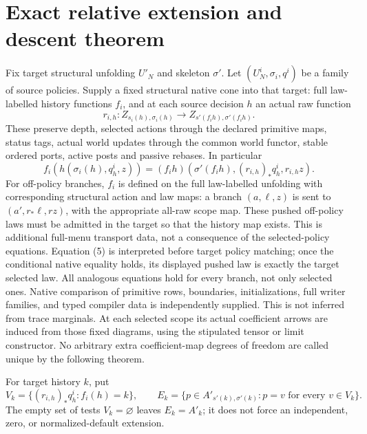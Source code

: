 \documentclass[11pt]{article}
\begin{document}
\section{Exact relative extension and descent theorem}
Fix target structural unfolding $U'_N$ and skeleton $\sigma'$. Let $(U_N^i,\sigma_i,q^i)$ be a family of source policies. Supply a fixed structural native cone into that target: full law-labelled history functions $f_i$, and at each source decision $h$ an actual raw function
\[
 r_{i,h}:Z_{s_i(h),\sigma_i(h)}\longrightarrow
          Z_{s'(f_i h),\sigma'(f_i h)}.                 \tag{4}
\]
These preserve depth, selected actions through the declared primitive maps, status tags, actual world updates through the common world functor, stable ordered ports, active posts and passive rebases. In particular
\[
 f_i(h(\sigma_i(h),q^i_h,z))=(f_i h)(\sigma'(f_i h),(r_{i,h})_*q^i_h,r_{i,h}z). \tag{5}
\]
For off-policy branches, $f_i$ is defined on the full law-labelled unfolding with corresponding structural action and law maps: a branch $(a,\ell,z)$ is sent to $(a',r_*\ell,rz)$, with the appropriate all-raw scope map. These pushed off-policy laws must be admitted in the target so that the history map exists. This is additional full-menu transport data, not a consequence of the selected-policy equations. Equation (5) is interpreted before target policy matching; once the conditional native equality holds, its displayed pushed law is exactly the target selected law. All analogous equations hold for every branch, not only selected ones. Native comparison of primitive rows, boundaries, initializations, full writer families, and typed compiler data is independently supplied. This is not inferred from trace marginals. At each selected scope its actual coefficient arrows are induced from those fixed diagrams, using the stipulated tensor or limit constructor. No arbitrary extra coefficient-map degrees of freedom are called unique by the following theorem.

For target history $k$, put
\[
 V_k=\{(r_{i,h})_*q^i_h:f_i(h)=k\},\qquad
 E_k=\{p\in A'_{s'(k),\sigma'(k)}:p=v\text{ for every }v\in V_k\}. \tag{6}
\]
The empty set of tests $V_k=\varnothing$ leaves $E_k=A'_k$; it does not force an independent, zero, or normalized-default extension.
\end{document}
